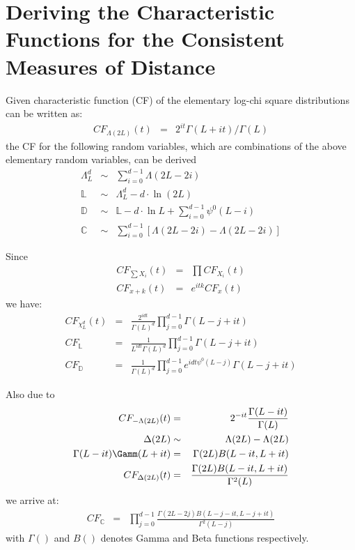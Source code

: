 \section{Deriving the Characteristic Functions for the Consistent Measures of Distance}

Given characteristic function (CF) of the elementary log-chi square distributions can be written as:
\begin{eqnarray}
 CF_{\Lambda(2L)}(t) &=& 2^{it}\Gamma(L+it)/\Gamma(L) \nonumber
\end{eqnarray}
  the CF for the following random variables,
  which are combinations of the above elementary random variables, can be derived
\begin{eqnarray*}
   \Lambda^d_L &\sim&  \sum^{d-1}_{i=0} \Lambda(2L-2i) \\
  \mathbb{L} &\sim&  \Lambda^d_L -d \cdot \ln(2L) \\
  \mathbb{D} &\sim& \mathbb{L} - d \cdot \ln{L} + \sum^{d-1}_{i=0} \psi^0(L-i) \\
  \mathbb{C} &\sim&  \sum^{d-1}_{i=0} \left[ \Lambda(2L-2i) - \Lambda(2L-2i) \right]
\end{eqnarray*}

Since
\begin{eqnarray*}
 CF_{\sum X_i}(t)   &=& \prod CF_{X_i}(t) \\
 CF_{x+k}(t) &=& e^{itk}CF_x(t)
\end{eqnarray*}
we have:
\begin{eqnarray}
  CF_{\chi^d_L}(t) &=& \frac{2^{idt}}{\Gamma(L)^d} \prod^{d-1}_{j=0} \Gamma(L-j+it) \\
   CF_{\mathbb{L}} &=& \frac{1}{L^{idt} \Gamma(L)^d}  \prod^{d-1}_{j=0} \Gamma(L-j+it) \\
   CF_{\mathbb{D}} &=& \frac{ 1 }{\Gamma(L)^d} \prod^{d-1}_{j=0} e^{idt \psi^0(L-j)} \Gamma(L-j+it)  
\end{eqnarray}

Also due to
\begin{eqnarray*}
  CF_{-\Lambda(2L)}(t) &=& 2^{-it}\frac{\Gamma(L-it)}{\Gamma(L)} \\ 
  \Delta(2L) &\sim& \Lambda(2L) - \Lambda(2L) \\
  \Gamma(L-it) \Gamm(L+it) &=&  \Gamma(2L)B(L-it,L+it) \\
   CF_{\Delta(2L)}(t) &=& \frac{\Gamma(2L)B(L-it,L+it)}{\Gamma^2(L)} 
\end{eqnarray*}
we arrive at:
\begin{eqnarray}
  CF_{\mathbb{C}} &=&  \prod^{d-1}_{j=0} \frac{\Gamma(2L-2j)B(L-j-it,L-j+it)}{\Gamma^2(L-j)} 
\end{eqnarray}
with $\Gamma()$ and $B()$ denotes Gamma and Beta functions respectively.

